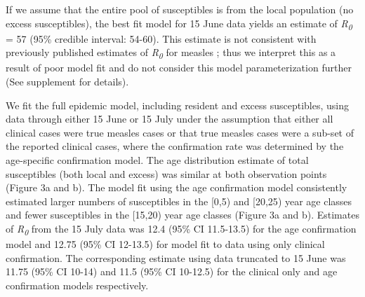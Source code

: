 If we assume that the entire pool of susceptibles is from the local population (no excess susceptibles), the best fit model for 15 June data yields an estimate of \emph{R\textsubscript{0}} = 57 (95\% credible interval: 54-60). This estimate is not consistent with previously published estimates of \emph{R\textsubscript{0}} for measles \cite{EDMUNDS_2000,MOSSONG_2000}; thus we interpret this as a result of poor model fit and do not consider this model parameterization further (See supplement for details).

We fit the full epidemic model, including resident and excess susceptibles, using data through either 15 June or 15 July under the assumption that either all clinical cases were true measles cases or that true measles cases were a sub-set of the reported clinical cases, where the confirmation rate was determined by the age-specific confirmation model. The age distribution estimate of total susceptibles (both local and excess) was similar at both observation points (Figure 3a and b). The model fit using the age confirmation model consistently estimated larger numbers of susceptibles in the {[}0,5) and {[}20,25{)} year age classes and fewer susceptibles in the {[}15,20) year age classes (Figure 3a and b). Estimates of \emph{R\textsubscript{0}} from the 15 July data was 12.4 (95\% CI 11.5-13.5) for the age confirmation model and 12.75 (95\% CI 12-13.5) for model fit to
data using only clinical confirmation. The corresponding estimate using data truncated to 15 June was 11.75 (95\% CI 10-14) and 11.5 (95\% CI 10-12.5) for the clinical only and age confirmation models respectively.